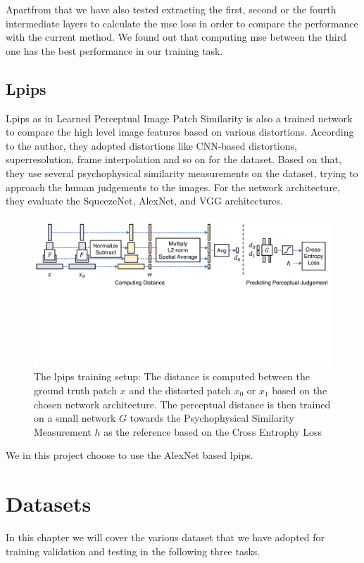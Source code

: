 \documentclass[a4paper,12pt,twoside]{report}
\begin{document}
Apartfrom that we have also tested extracting the first, second or the fourth intermediate layers to calculate the mse loss in order to compare the performance with the current method. We found out that computing mse between the third one has the best performance in our training task.

\section{Lpips}
Lpips as in Learned Perceptual Image Patch Similarity\cite{zhang2018perceptual} is also a trained network to compare the high level image features based on various distortions. According to the author, they adopted distortions like CNN-based distortions, superresolution, frame interpolation and so on for the dataset. Based on that, they use several psychophysical similarity measurements on the dataset, trying to approach the human judgements to the images. For the network architecture, they evaluate the SqueezeNet, AlexNet, and VGG architectures.
\begin{figure}
\centering
\includegraphics[width=1.0\textwidth]{network_lpips.pdf}
\caption{The lpips training setup: The distance is computed between the ground truth patch $x$ and the distorted patch $x_0$ or $x_1$ based on the chosen network architecture. The perceptual distance is then trained on a small network $G$ towards the Psychophysical Similarity Measurement $h$ as the reference based on the Cross Entrophy Loss\cite{zhang2018perceptual}}
\end{figure}
We in this project choose to use the AlexNet based lpips.







\chapter{Datasets}
In this chapter we will cover the various dataset that we have adopted for training validation and testing in the following three tasks.
\end{document}
